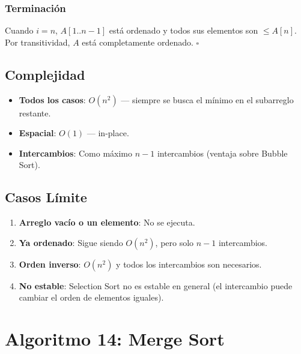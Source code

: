 \documentclass[11pt,a4paper]{article}
\begin{document}
\subsubsection{Terminación}
Cuando $i = n$, $A[1..n-1]$ está ordenado y todos sus elementos son $\leq A[n]$. Por transitividad, $A$ está completamente ordenado. $\square$

\subsection{Complejidad}
\begin{itemize}
    \item \textbf{Todos los casos}: $O(n^2)$ --- siempre se busca el mínimo en el subarreglo restante.
    \item \textbf{Espacial}: $O(1)$ --- in-place.
    \item \textbf{Intercambios}: Como máximo $n-1$ intercambios (ventaja sobre Bubble Sort).
\end{itemize}

\subsection{Casos Límite}
\begin{enumerate}
    \item \textbf{Arreglo vacío o un elemento}: No se ejecuta.
    \item \textbf{Ya ordenado}: Sigue siendo $O(n^2)$, pero solo $n-1$ intercambios.
    \item \textbf{Orden inverso}: $O(n^2)$ y todos los intercambios son necesarios.
    \item \textbf{No estable}: Selection Sort no es estable en general (el intercambio puede cambiar el orden de elementos iguales).
\end{enumerate}

\newpage

\section{Algoritmo 14: Merge Sort}
\end{document}
